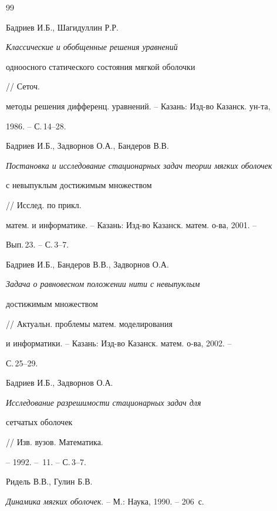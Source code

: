 \begin{thebibliography}{99}







Бадриев И.Б., Шагидуллин Р.Р.


{\em Классические и обобщенные решения уравнений 


одноосного статического состояния мягкой оболочки} // Сеточ.


методы решения дифференц. уравнений. -- Казань: Изд-во Казанск. ун-та, 


1986. -- С.\,14--28. 







Бадриев И.Б., Задворнов О.А., Бандеров В.В.


{\em Постановка и исследование стационарных задач теории мягких оболочек


с невыпуклым достижимым множеством} // Исслед. по прикл.


матем. и информатике. -- Казань: Изд-во Казанск. матем. о-ва, 2001. --


Вып.\,23. -- С.\,3--7.







Бадриев И.Б., Бандеров В.В., Задворнов О.А.


{\em Задача о равновесном положении нити с невыпуклым 


достижимым множеством} // Актуальн. проблемы матем. моделирования


и информатики. -- Казань: Изд-во Казанск. матем. о-ва, 2002. --


С.\,25--29.







Бадриев И.Б., Задворнов О.А.


{\em Исследование разрешимости стационарных задач для 


сетчатых оболочек} // Изв. вузов. Математика.


-- 1992. -- \No\,11. -- С.\,3--7.







Ридель В.В., Гулин Б.В.


{\em Динамика мягких оболочек}. -- М.: Наука, 1990. -- 206~с.






\end{thebibliography}
